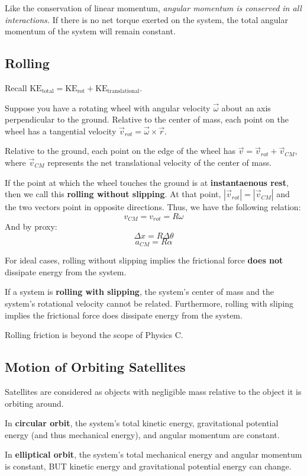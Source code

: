 \documentclass{article}
\begin{document}
Like the conservation of linear momentum, \textit{angular momentum is conserved in all interactions.}
If there is no net torque exerted on the system, the total angular momentum of the system will remain constant.

\subsection{Rolling}
Recall $\textrm{KE}_{\textrm{total}} = \textrm{KE}_{\textrm{rot}} + \textrm{KE}_{\textrm{translational}}$.

Suppose you have a rotating wheel with angular velocity $\vec{\omega}$ about an axis perpendicular to the ground.
Relative to the center of mass, each point on the wheel has a tangential velocity $\vec{v}_{rot} = \vec{\omega} \times \vec{r}$.

Relative to the ground, each point on the edge of the wheel has $\vec{v} = \vec{v}_{rot} + \vec{v}_{CM}$, where $\vec{v}_{CM}$ represents the net translational velocity of the center of mass.

If the point at which the wheel touches the ground is at \textbf{instantaenous rest}, then we call this \textbf{rolling without slipping}.
At that point, $|\vec{v}_{rot}| = |\vec{v}_{CM}|$ and the two vectors point in opposite directions.
Thus, we have the following relation:
\[v_{CM} = v_{rot} = R \omega\]
And by proxy:
\[\Delta x = R \Delta \theta\]
\[a_{CM} = R \alpha\]

For ideal cases, rolling without slipping implies the frictional force \textbf{does not} dissipate energy from the system.

If a system is \textbf{rolling with slipping}, the system's center of mass and the system's rotational velocity cannot be related.
Furthermore, rolling with sliping implies the frictional force does dissipate energy from the system.

Rolling friction is beyond the scope of Physics C.

\subsection{Motion of Orbiting Satellites}
Satellites are considered as objects with negligible mass relative to the object it is orbiting around.

In \textbf{circular orbit}, the system's total kinetic energy, gravitational potential energy (and thus mechanical energy), and angular momentum are constant.

In \textbf{elliptical orbit}, the system's total mechanical energy and angular momentum is constant, BUT kinetic energy and gravitational potential energy can change.
\end{document}
